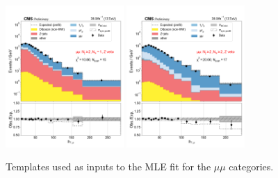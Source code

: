 \begin{figure}[htb!]
    \centering
    \includegraphics[width=0.4\textwidth]{chapters/Analysis/sectionStatisticalAnalysis/figures/fit/mumu_cat_gt2_eq1_b}
    \includegraphics[width=0.4\textwidth]{chapters/Analysis/sectionStatisticalAnalysis/figures/fit/mumu_cat_gt2_gt2_b}

    \caption{Templates used as inputs to the MLE fit for the $\mu\mu$ categories.}
    \label{fig:fits_templates_mumu}
\end{figure}

